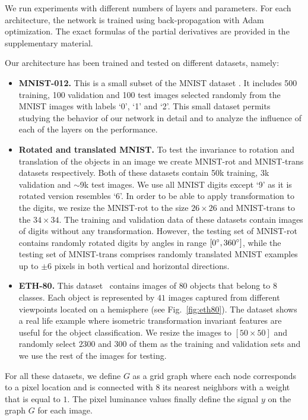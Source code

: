 \documentclass[10pt,journal,compsoc]{IEEEtran}
\begin{document}
	We run experiments with different numbers of layers and parameters. For each architecture, the network is trained using back-propagation with Adam~\cite{bb:adam} optimization. The exact formulas of the partial derivatives are provided in the supplementary material. 
	
	Our architecture has been trained and tested on different datasets, namely:
	\begin{itemize}[topsep=0pt, partopsep=0pt]
		\setlength\itemsep{0pt}
		\setlength{\parskip}{1pt}
		\item \textbf{MNIST-012.} 
		This is a small subset of the MNIST dataset \cite{bb:lecun-mnisthandwrittendigit-2010}. It includes 500 training, 100 validation and 100 test images selected randomly from the MNIST images
		with labels `0', `1' and `2'. This small dataset permits studying the behavior of our network in detail and to analyze the influence of each of the layers on the performance.
		\item 
		\textbf{Rotated and translated MNIST.} 
		To test the invariance to rotation and translation of the objects in an image
		we create MNIST-rot and MNIST-trans datasets respectively.
		Both of these datasets contain 50k training, 3k validation and $\sim$9k test images. We use all MNIST digits \cite{bb:lecun-mnisthandwrittendigit-2010} except `9' as it is rotated version resembles `6'.
		In order to be able to apply transformation to the digits, we resize the MNIST-rot to the size $26 \times 26$ and MNIST-trans to the $34 \times 34$.
		The training and validation data of these datasets contain images of digits without any transformation. However, the testing set of  MNIST-rot contains randomly rotated digits by angles in range $[0\degree, 360\degree]$, while the testing set of MNIST-trans comprises randomly translated MNIST examples up to $\pm 6$ pixels in both vertical and horizontal directions.
		\item 
		\textbf{ETH-80.} 
		This dataset~\cite{bb:ETH80} contains images of $80$ objects that belong to $8$ classes. Each object is represented by $41$ images captured from different viewpoints located on a hemisphere (see Fig.~\ref{fig:eth80}). The dataset shows a real life example where isometric transformation invariant features are useful for the object classification. We resize the images to $[50 \times 50]$ and randomly select $2300$ and $300$ of them as the training and validation sets and we use the rest of the images for testing.
	\end{itemize}
	\noindent
	For all these datasets, we define $G$ as a grid graph where each node corresponds to a pixel location and is connected with 8 its nearest neighbors with a weight that is equal to $1$. The pixel luminance values finally define the signal $y$ on the graph $G$ for each image. 
	
\end{document}
